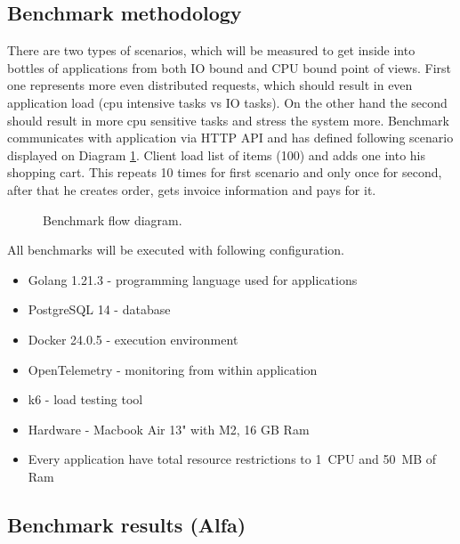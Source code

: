 



\subsection{Benchmark methodology}
There are two types of scenarios, which will be measured to get inside into bottles of applications from both IO bound and CPU bound point of views. First one represents more even distributed requests, which should result in even application load (cpu intensive tasks vs IO tasks).
On the other hand the second should result in more cpu sensitive tasks and stress the system more.
Benchmark communicates with application via HTTP API and has defined following scenario displayed on Diagram \ref{img:benchmark_flow}.
Client load list of items (100) and adds one into his shopping cart. This repeats 10 times for first scenario and only once for second, after that he creates order, gets invoice information and pays for it.

\begin{figure}
    \centering
    
    \caption{Benchmark flow diagram. \label{img:benchmark_flow}}
\end{figure}

All benchmarks will be executed with following configuration.
\begin{itemize}
    \item Golang 1.21.3 - programming language used for applications
    \item PostgreSQL 14 - database
    \item Docker 24.0.5 - execution environment
    \item OpenTelemetry - monitoring from within application
    \item k6 - load testing tool
    \item Hardware - Macbook Air 13" with M2, 16 GB Ram
    \item Every application have total resource restrictions to 1~CPU and 50~MB of Ram
\end{itemize}

\subsection{Benchmark results (Alfa)}


